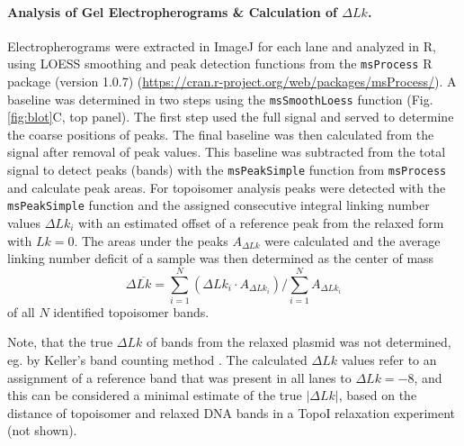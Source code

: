 \documentclass[10pt,a4]{article}
\def\cite#1{\hypersetup{citecolor=Teal}\citep{#1}} %
\begin{document}
\paragraph{Analysis of Gel Electropherograms \& Calculation of $\Delta Lk$.}
Electropherograms were extracted in ImageJ for each lane and analyzed
in R, using LOESS smoothing and peak detection functions from the
\texttt{msProcess} R package (version 1.0.7)
(\url{https://cran.r-project.org/web/packages/msProcess/}). A baseline
was determined in two steps using the \texttt{msSmoothLoess} function
(Fig. \ref{fig:blot}C, top panel).  The first step used the full
signal and served to determine the coarse positions of peaks.  The
final baseline was then calculated from the signal after removal of
peak values. This baseline was subtracted from the total signal to
detect peaks (bands) with the \texttt{msPeakSimple} function from
\texttt{msProcess} and calculate peak areas.  
%
For topoisomer analysis peaks were detected with the
\texttt{msPeakSimple} function and the assigned consecutive integral
linking number values $\Delta Lk_i$ with an estimated offset of a
reference peak from the relaxed form with $Lk=0$. The areas under the
peaks $A_{\Delta Lk}$ were calculated and the average linking number
deficit of a sample was then determined as the center of mass
\begin{equation}
  \label{eq:dlk}
  \Delta \overline{Lk} = \sum_{i=1}^N{(\Delta Lk_i \cdot
    A_{\Delta Lk_i})}/\sum_{i=1}^N{A_{\Delta Lk_i}}
\end{equation}
of all $N$ identified topoisomer bands.

Note, that the true $\Delta Lk$ of bands from the relaxed plasmid was
not determined, eg. by Keller's band counting method
\cite{Keller1975b}.  The calculated $\Delta Lk$ values refer to an
assignment of a reference band that was present in all lanes to
$\Delta Lk=-8$, and this can be considered a minimal estimate of the
true $|\Delta Lk|$, based on the distance of topoisomer and relaxed DNA
bands in a TopoI relaxation experiment (not shown).

\setlength{\bibsep}{0.0pt}
\begin{spacing}{0.9}
  
\end{spacing}
\end{document}
